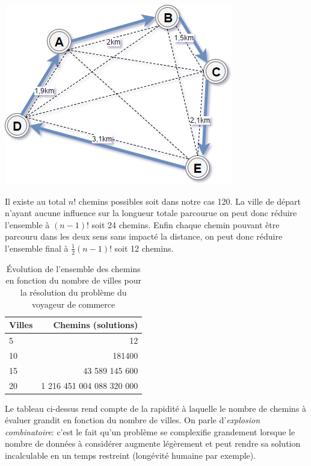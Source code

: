 \begin{center}
    \includegraphics[scale=0.6]{../ressources/images/probleme_voyageur.png}
\end{center}

Il existe au total $n!$ chemins possibles soit dans notre cas 120. La ville de départ n'ayant aucune influence sur la longueur totale parcourue on peut donc réduire l'ensemble à $(n-1)!$ soit 24 chemins. Enfin chaque chemin pouvant être parcouru dans les deux sens sans impacté la distance,  on peut donc réduire l'ensemble final à $\frac{1}{2}(n-1)!$ soit 12 chemins.

\begin{table}[h]
\centering
\begin{tabular}{ l|r }
  Villes & Chemins (solutions) \\
  \hline
  5 & 12 \\
  10 & 181400 \\
  15 & 43 589 145 600 \\
  20 & 1 216 451 004 088 320 000\\
\end{tabular}
  \caption{Évolution de l'ensemble des chemins en fonction du nombre de villes pour la résolution du problème du voyageur de commerce}
\end{table}

Le tableau ci-dessus rend compte de la rapidité à laquelle le nombre de chemins à évaluer grandit en fonction du nombre de villes. On parle d'\textit{explosion combinatoire}: c'est le fait qu'un problème se complexifie grandement lorsque le nombre de données à considérer augmente légèrement et peut rendre sa solution incalculable en un temps restreint (longévité humaine par exemple).

